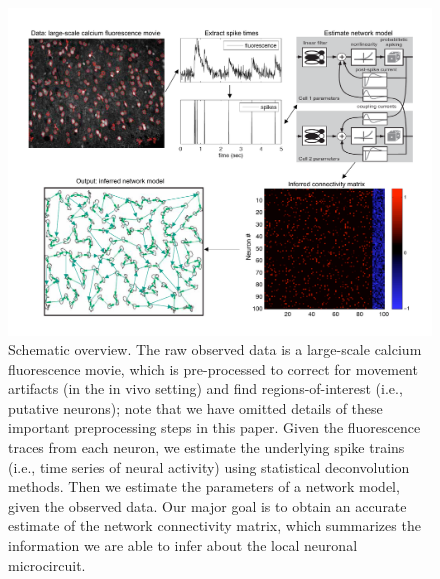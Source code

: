 \begin{figure}[t!]
\centering \includegraphics[width=\hsize]{../figs/yuri-paper-schematic}
\caption{Schematic overview. The raw observed data is a large-scale calcium fluorescence movie, which is pre-processed to correct for movement artifacts (in the in vivo setting) and find regions-of-interest (i.e., putative neurons); note that we have omitted details of these important preprocessing steps in this paper. Given the fluorescence traces from each neuron, we estimate the underlying spike trains (i.e., time series of neural activity) using statistical deconvolution methods. Then we estimate the parameters of a network model, given the observed data. Our major goal is to obtain an accurate estimate of the network connectivity matrix, which summarizes the information we are able to infer about the local neuronal microcircuit.}
\label{fig:data_schematic} \end{figure}
